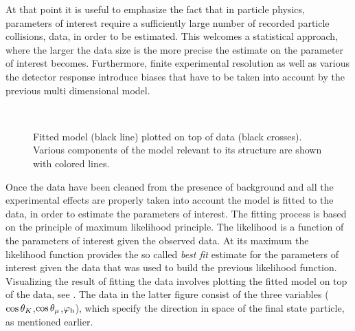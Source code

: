 At that point it is useful to emphasize the fact that in particle physics, parameters of interest
require a sufficiently large number of recorded particle collisions, data, in order to be estimated.
This welcomes a statistical approach, where the larger the data size is the more precise the estimate
on the parameter of interest becomes. Furthermore, finite experimental resolution as well as
various the detector response introduce biases that have to be taken into account by the previous
multi dimensional model.

\begin{figure}[!t]
  \begin{subfigure}{0.5\textwidth}
    \centering
    \scalebox{1.2}{}
  \end{subfigure}%
  \hfill
  \begin{subfigure}{0.5\textwidth}
    \centering
    \scalebox{1.2}{}
  \end{subfigure}\\
  \begin{subfigure}{\textwidth}
    \centering
    \scalebox{1.2}{}
  \end{subfigure}
  \caption{Fitted model (black line) plotted on top of \BsJpsiKst data (black crosses).
           Various components of the model relevant to its \CP structure are shown with colored lines.}
  \label{app_angular_plot_thetas}
\end{figure}

Once the data have been cleaned from the presence of background and all the experimental effects are
properly taken into account the model is fitted to the data, in order to estimate the parameters of interest.
The fitting process is based on the principle of maximum likelihood principle. The likelihood is a
function of the parameters of interest given the observed data. At its maximum the likelihood function
provides the so called {\it best fit} estimate for the parameters of interest given the data that was
used to build the previous likelihood function. Visualizing the result of fitting the data involves
plotting the fitted model on top of the data, see . The data in the latter figure consist
of the three variables ($\cos\theta_{K}$,$\cos\theta_{\mu}$,$\varphi_{\rm h}$), which specify the direction in space
of the final state particle, as mentioned earlier.


